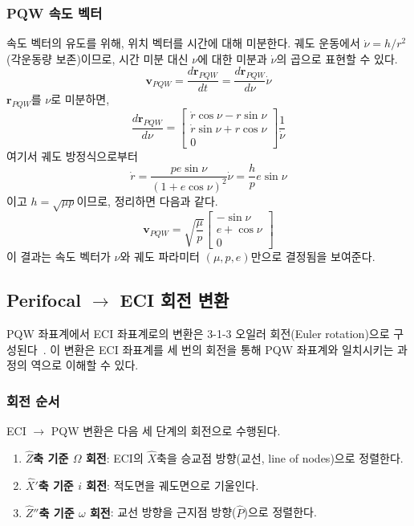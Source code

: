 \documentclass[11pt]{article}
\begin{document}
\subsubsection{PQW 속도 벡터}

속도 벡터의 유도를 위해, 위치 벡터를 시간에 대해 미분한다. 궤도 운동에서 $\dot{\nu} = h / r^2$ (각운동량 보존)이므로, 시간 미분 대신 $\nu$에 대한 미분과 $\dot{\nu}$의 곱으로 표현할 수 있다.
\[
  \mathbf{v}_{PQW} = \frac{d\mathbf{r}_{PQW}}{dt} = \frac{d\mathbf{r}_{PQW}}{d\nu}\dot{\nu}
\]
$\mathbf{r}_{PQW}$를 $\nu$로 미분하면,
\[
  \frac{d\mathbf{r}_{PQW}}{d\nu} = \begin{bmatrix} \dot{r}\cos\nu - r\sin\nu \\ \dot{r}\sin\nu + r\cos\nu \\ 0 \end{bmatrix} \frac{1}{\dot{\nu}}
\]
여기서 궤도 방정식으로부터
\[
  \dot{r} = \frac{pe\sin\nu}{(1+e\cos\nu)^2}\dot{\nu} = \frac{h}{p}e\sin\nu
\]
이고 $h = \sqrt{\mu p}$이므로, 정리하면 다음과 같다.
\[
  \mathbf{v}_{PQW} = \sqrt{\frac{\mu}{p}} \begin{bmatrix} -\sin\nu \\ e + \cos\nu \\ 0 \end{bmatrix}
\]
이 결과는 속도 벡터가 $\nu$와 궤도 파라미터 $(\mu, p, e)$만으로 결정됨을 보여준다.

\subsection{Perifocal $\to$ ECI 회전 변환}

PQW 좌표계에서 ECI 좌표계로의 변환은 3-1-3 오일러 회전(Euler rotation)으로 구성된다~\cite{Vallado2013}. 이 변환은 ECI 좌표계를 세 번의 회전을 통해 PQW 좌표계와 일치시키는 과정의 역으로 이해할 수 있다.

\subsubsection{회전 순서}

ECI $\to$ PQW 변환은 다음 세 단계의 회전으로 수행된다.

\begin{enumerate}
  \item \textbf{$\hat{Z}$축 기준 $\Omega$ 회전}: ECI의 $\hat{X}$축을 승교점 방향(교선, line of nodes)으로 정렬한다.
  \item \textbf{$\hat{X}'$축 기준 $i$ 회전}: 적도면을 궤도면으로 기울인다.
  \item \textbf{$\hat{Z}''$축 기준 $\omega$ 회전}: 교선 방향을 근지점 방향($\hat{P}$)으로 정렬한다.
\end{enumerate}
\end{document}
